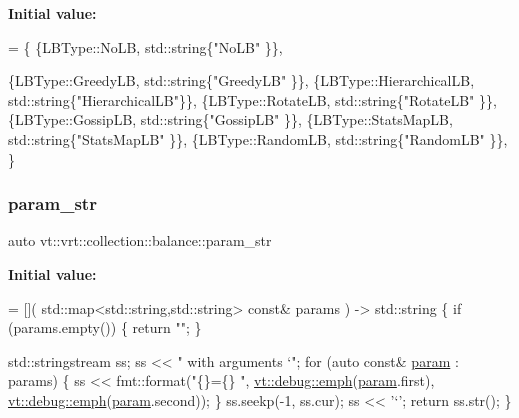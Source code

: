 {\bfseries Initial value\+:}
\begin{DoxyCode}
= \{
  \{LBType::NoLB,           std::string\{\textcolor{stringliteral}{"NoLB"}          \}\},



  \{LBType::GreedyLB,       std::string\{\textcolor{stringliteral}{"GreedyLB"}      \}\},
  \{LBType::HierarchicalLB, std::string\{\textcolor{stringliteral}{"HierarchicalLB"}\}\},
  \{LBType::RotateLB,       std::string\{\textcolor{stringliteral}{"RotateLB"}      \}\},
  \{LBType::GossipLB,       std::string\{\textcolor{stringliteral}{"GossipLB"}      \}\},
  \{LBType::StatsMapLB,     std::string\{\textcolor{stringliteral}{"StatsMapLB"}    \}\},
  \{LBType::RandomLB,       std::string\{\textcolor{stringliteral}{"RandomLB"}      \}\},
\}
\end{DoxyCode}
\mbox{\label{namespacevt_1_1vrt_1_1collection_1_1balance_aaed7e09146a45c2932ca185a55161723}} 
\subsubsection{\texorpdfstring{param\+\_\+str}{param\_str}}
{\footnotesize\ttfamily auto vt\+::vrt\+::collection\+::balance\+::param\+\_\+str}

{\bfseries Initial value\+:}
\begin{DoxyCode}
= [](
  std::map<std::string,std::string> \textcolor{keyword}{const}& params
) -> std::string \{
  \textcolor{keywordflow}{if} (params.empty()) \{
    \textcolor{keywordflow}{return} \textcolor{stringliteral}{""};
  \}

  std::stringstream ss;
  ss << \textcolor{stringliteral}{" with arguments `"};
  \textcolor{keywordflow}{for} (\textcolor{keyword}{auto} \textcolor{keyword}{const}& \hyperlink{namespacevt_1_1config_a6bd1d6215bda0d8ca02811798399f689ab9f079503fc8bbc11679d6dd6d2a2d16}{param} : params) \{
    ss << fmt::format(\textcolor{stringliteral}{"\{\}=\{\} "},
      \hyperlink{namespacevt_1_1debug_add365336d7aa2053b5b7588ccad48ac7}{vt::debug::emph}(\hyperlink{namespacevt_1_1config_a6bd1d6215bda0d8ca02811798399f689ab9f079503fc8bbc11679d6dd6d2a2d16}{param}.first),
      \hyperlink{namespacevt_1_1debug_add365336d7aa2053b5b7588ccad48ac7}{vt::debug::emph}(\hyperlink{namespacevt_1_1config_a6bd1d6215bda0d8ca02811798399f689ab9f079503fc8bbc11679d6dd6d2a2d16}{param}.second));
  \}
  ss.seekp(-1, ss.cur);
  ss << \textcolor{charliteral}{'`'};
  \textcolor{keywordflow}{return} ss.str();
\}
\end{DoxyCode}
